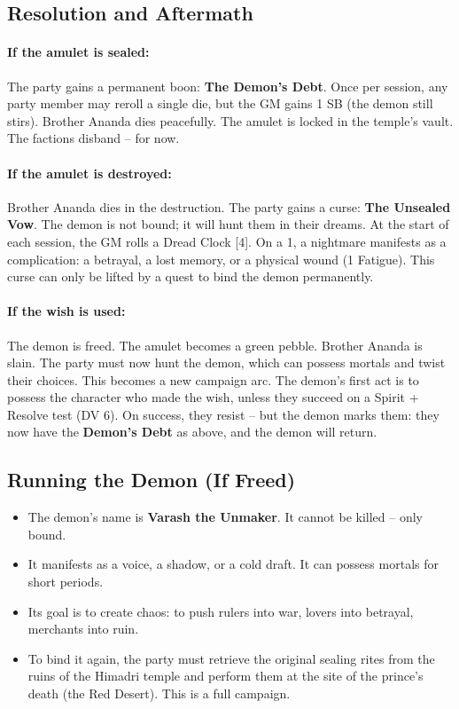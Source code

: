 \documentclass[11pt]{book}
\begin{document}
\subsection{Resolution and Aftermath}

\paragraph{If the amulet is sealed:}
The party gains a permanent boon: \textbf{The Demon’s Debt}. Once per session, any party member may reroll a single die, but the GM gains 1 SB (the demon still stirs). Brother Ananda dies peacefully. The amulet is locked in the temple’s vault. The factions disband – for now.

\paragraph{If the amulet is destroyed:}
Brother Ananda dies in the destruction. The party gains a curse: \textbf{The Unsealed Vow}. The demon is not bound; it will hunt them in their dreams. At the start of each session, the GM rolls a Dread Clock [4]. On a 1, a nightmare manifests as a complication: a betrayal, a lost memory, or a physical wound (1 Fatigue). This curse can only be lifted by a quest to bind the demon permanently.

\paragraph{If the wish is used:}
The demon is freed. The amulet becomes a green pebble. Brother Ananda is slain. The party must now hunt the demon, which can possess mortals and twist their choices. This becomes a new campaign arc. The demon’s first act is to possess the character who made the wish, unless they succeed on a Spirit + Resolve test (DV 6). On success, they resist – but the demon marks them: they now have the \textbf{Demon’s Debt} as above, and the demon will return.

\subsection{Running the Demon (If Freed)}
\begin{itemize}
    \item The demon’s name is \textbf{Varash the Unmaker}. It cannot be killed – only bound.
    \item It manifests as a voice, a shadow, or a cold draft. It can possess mortals for short periods.
    \item Its goal is to create chaos: to push rulers into war, lovers into betrayal, merchants into ruin.
    \item To bind it again, the party must retrieve the original sealing rites from the ruins of the Himadri temple and perform them at the site of the prince’s death (the Red Desert). This is a full campaign.
\end{itemize}
\end{document}
